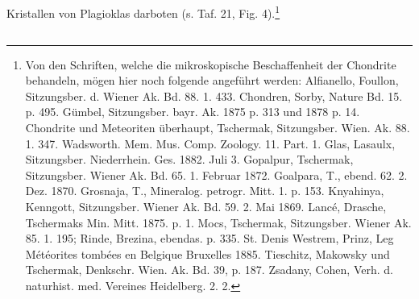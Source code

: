 \documentclass[a4paper, 12pt, oneside]{article}
\begin{document}
Kristallen von Plagioklas darboten (s. Taf. 21, Fig. 4).\footnote{Von den Schriften, welche die mikroskopische Beschaffenheit der Chondrite behandeln, mögen hier noch folgende angeführt werden: Alfianello, Foullon, Sitzungsber. d. Wiener Ak. Bd. 88. 1. 433. Chondren, Sorby, Nature Bd. 15. p. 495. Gümbel, Sitzungsber. bayr. Ak. 1875 p. 313 und 1878 p. 14. Chondrite und Meteoriten überhaupt, Tschermak, Sitzungsber. Wien. Ak. 88. 1. 347. Wadsworth. Mem. Mus. Comp. Zoology. 11. Part. 1. Glas, Lasaulx, Sitzungsber. Niederrhein. Ges. 1882. Juli 3. Gopalpur, Tschermak, Sitzungsber. Wiener Ak. Bd. 65. 1. Februar 1872. Goalpara, T., ebend. 62. 2. Dez. 1870. Grosnaja, T., Mineralog. petrogr. Mitt. 1. p. 153. Knyahinya, Kenngott, Sitzungsber. Wiener Ak. Bd. 59. 2. Mai 1869. Lancé, Drasche, Tschermaks Min. Mitt. 1875. p. 1. Mocs, Tschermak, Sitzungsber. Wiener Ak. 85. 1. 195; Rinde, Brezina, ebendas. p. 335. St. Denis Westrem, Prinz, Leg Météorites tombées en Belgique Bruxelles 1885. Tieschitz, Makowsky und Tschermak, Denkschr. Wien. Ak. Bd. 39, p. 187. Zsadany, Cohen, Verh. d. naturhist. med. Vereines Heidelberg. 2. 2.}
\clearpage
\subsection{}
\end{document}
